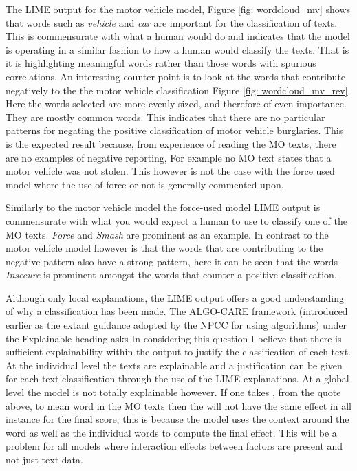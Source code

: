 The LIME output for the motor vehicle model, Figure \ref{fig: wordcloud_mv} shows that words such as \emph{vehicle} and \emph{car} are important for the classification of texts. This is commensurate with what a human would do and indicates that the model is operating in a similar fashion to how a human would classify the texts. That is it is highlighting meaningful words rather than those words with spurious correlations. An interesting counter-point is to look at the words that contribute negatively to the the motor vehicle classification Figure \ref{fig: wordcloud_mv_rev}. Here the words selected are more evenly sized, and therefore of even importance. They are mostly common words. This indicates that there are no particular patterns for negating the positive classification of motor vehicle burglaries. This is the expected result because, from experience of reading the MO texts, there are no examples of negative reporting, For example no MO text states that a motor vehicle was not stolen. This however is not the case with the force used model where the use of force or not is generally commented upon.

Similarly to the motor vehicle model the force-used model LIME output is commensurate with what you would expect a human to use to classify one of the MO texts. \emph{Force} and \emph{Smash} are prominent as an example. In contrast to the motor vehicle model however is that the words that are contributing to the negative pattern also have a strong pattern, here it can be seen that the words \emph{Insecure} is prominent amongst the words that counter a positive classification. 

Although only local explanations, the LIME output offers a good understanding of why a classification has been made. The ALGO-CARE framework (introduced earlier as the extant guidance adopted by the NPCC for using algorithms) under the Explainable heading asks  In considering this question I believe that there is sufficient explainability within the output to justify the classification of each text. At the individual level the texts are explainable and a justification can be given for each text classification through the use of the LIME explanations. At a global level the model is not totally explainable however. If one takes , from the quote above, to mean word in the MO texts then the  will not have the same effect in all instance for the final score, this is because the model uses the context around the word as well as the individual words to compute the final effect. This will be a problem for all models where interaction effects between factors are present and not just text data.

